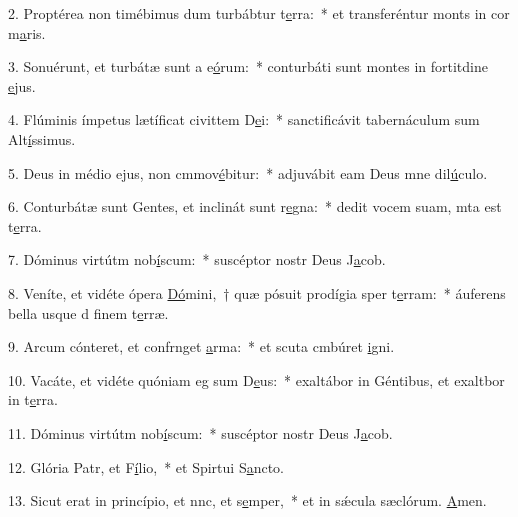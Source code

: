 2. Proptérea non timébimus dum turbábtur t\uline{e}rra:~* et transferéntur monts in cor m\uline{a}ris.\par 
3. Sonuérunt, et turbátæ sunt a e\uline{ó}rum:~* conturbáti sunt montes in fortitdine \uline{e}jus.\par 
4. Flúminis ímpetus lætíficat civittem D\uline{e}i:~* sanctificávit tabernáculum sum Alt\uline{í}ssimus.\par 
5. Deus in médio ejus, non cmmov\uline{é}bitur:~* adjuvábit eam Deus mne dil\uline{ú}culo.\par 
6. Conturbátæ sunt Gentes, et inclinát sunt r\uline{e}gna:~* dedit vocem suam, mta est t\uline{e}rra.\par 
7. Dóminus virtútm nob\uline{í}scum:~* suscéptor nostr Deus J\uline{a}cob.\par 
8. Veníte, et vidéte ópera \uline{Dó}mini,~† quæ pósuit prodígia sper t\uline{e}rram:~* áuferens bella usque d finem t\uline{e}rræ.\par 
9. Arcum cónteret, et confrnget \uline{a}rma:~* et scuta cmbúret \uline{i}gni.\par 
10. Vacáte, et vidéte quóniam eg sum D\uline{e}us:~* exaltábor in Géntibus, et exaltbor in t\uline{e}rra.\par 
11. Dóminus virtútm nob\uline{í}scum:~* suscéptor nostr Deus J\uline{a}cob.\par 
12. Glória Patr, et F\uline{í}lio,~* et Spirtui S\uline{a}ncto.\par 
13. Sicut erat in princípio, et nnc, et s\uline{e}mper,~* et in sǽcula sæclórum. \uline{A}men.\par 
